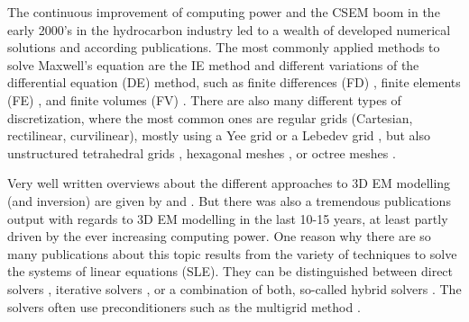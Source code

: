 \documentclass[a4paper, extra, camera,%
]{gji}
\begin{document}
The continuous improvement of computing power and the CSEM boom in the early 2000's in the hydrocarbon industry led to a wealth of developed numerical solutions and according publications. The most commonly applied methods to solve Maxwell's equation are the IE method \citep{GJI.74.Raiche, RS.02.Hursan, GEO.06.Zhdanov, GP.10.Tehrani, CAG.16.Kruglyakov, MGS.17.Kruglyakov} and different variations of the differential equation (DE) method, such as finite differences (FD) \citep{GEO.93.Wang, RS.94.Druskin, RSC.94.Mackie, GEO.09.Streich, CAG.13.Sommer}, finite elements (FE) \citep{GEO.04.Commer, GJI.11.Schwarzbach,GEO.12.daSilva, GJI.13.Grayver, GJI.13.Puzyrev, SEG.16.Zhang}, and finite volumes (FV) \citep{EM.90.Madsen, SIAM.01.Haber, PIER.01.Clemens, GEO.14.Jahandari}. There are also many different types of discretization, where the most common ones are regular grids (Cartesian, rectilinear, curvilinear), mostly using a Yee grid \citep{IEEE.66.Yee} or a Lebedev grid \citep{CMMP.64.Lebedev}, but also unstructured tetrahedral grids \citep{SEG.16.Zhang, CAG.17.Cai}, hexagonal meshes \citep{CAG.14.Cai}, or octree meshes \citep{ECP.07.Haber}.

Very well written overviews about the different approaches to 3D EM modelling (and inversion) are given by \cite{SG.05.Avdeev} and \cite{SG.10.Borner}. But there was also a tremendous publications output with regards to 3D EM modelling in the last 10-15 years, at least partly driven by the ever increasing computing power. One reason why there are so many publications about this topic results from the variety of techniques to solve the systems of linear equations (SLE). They can be distinguished between direct solvers \citep{GEO.09.Streich, GP.14.Chung, GEO.14.Jaysaval, GEO.15.Grayver, SEG.15.Oh, GJI.18.Wang}, iterative solvers \citep{GP.06.Mulder, GJI.15.Jaysaval}, or a combination of both, so-called hybrid solvers \citep{GEO.18.Liu}. The solvers often use preconditioners such as the multigrid method \citep{SIAM.02.Aruliah, GJI.16.Jaysaval}.
\end{document}
